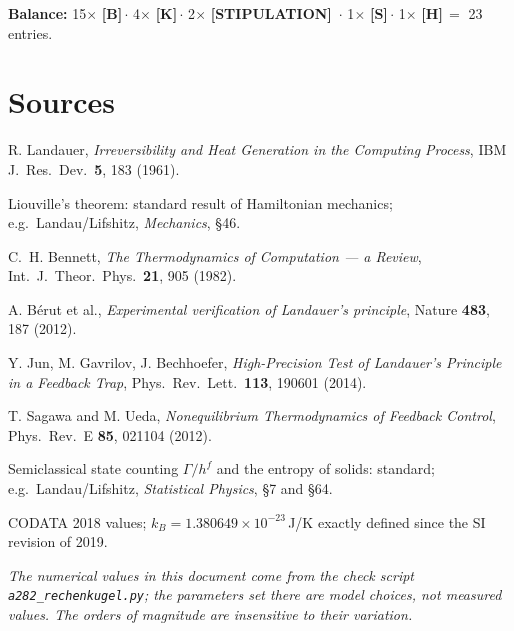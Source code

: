 \documentclass[11pt,a4paper]{article}
\newcommand{\LS}{\textcolor{laySet}{\textbf{\footnotesize\textsf{[STIPULATION]}}}\,}
\newcommand{\LK}{\textcolor{layK}{\textbf{\footnotesize\textsf{[K]}}}\,}
\newcommand{\LB}{\textcolor{layB}{\textbf{\footnotesize\textsf{[B]}}}\,}
\newcommand{\LSk}{\textcolor{layS}{\textbf{\footnotesize\textsf{[S]}}}\,}
\newcommand{\LH}{\textcolor{layH}{\textbf{\footnotesize\textsf{[H]}}}\,}
\begin{document}
\textbf{Balance:} 15$\times$ \LB $\cdot$ 4$\times$ \LK $\cdot$ 2$\times$ \LS
$\cdot$ 1$\times$ \LSk $\cdot$ 1$\times$ \LH $=$ 23 entries.

\clearpage
{}
{}
\section*{Sources}

\begingroup
\small
\begin{description}[leftmargin=3.2em,style=sameline,itemsep=0.3em]

\item[{[B1]}] R. Landauer, \emph{Irreversibility and Heat Generation in the
Computing Process}, IBM J.\ Res.\ Dev.\ \textbf{5}, 183 (1961).

\item[{[B2]}] Liouville's theorem: standard result of Hamiltonian mechanics;
e.g.\ Landau/Lifshitz, \emph{Mechanics}, §46.

\item[{[B3]}] C.~H. Bennett, \emph{The Thermodynamics of Computation --- a
Review}, Int.\ J.\ Theor.\ Phys.\ \textbf{21}, 905 (1982).

\item[{[B4]}] A. Bérut et al., \emph{Experimental verification of Landauer's
principle}, Nature \textbf{483}, 187 (2012).

\item[{[B5]}] Y. Jun, M. Gavrilov, J. Bechhoefer, \emph{High-Precision Test of
Landauer's Principle in a Feedback Trap}, Phys.\ Rev.\ Lett.\ \textbf{113},
190601 (2014).

\item[{[B6]}] T. Sagawa and M. Ueda, \emph{Nonequilibrium Thermodynamics of
Feedback Control}, Phys.\ Rev.\ E \textbf{85}, 021104 (2012).

\item[{[B7]}] Semiclassical state counting $\Gamma/h^f$ and the entropy of
solids: standard; e.g.\ Landau/Lifshitz, \emph{Statistical Physics}, §7 and §64.

\item[{[B8]}] CODATA 2018 values; $k_B = 1.380649\times10^{-23}$\,J/K exactly
defined since the SI revision of 2019.

\end{description}
\endgroup

\vspace{1em}
\noindent
{\small\itshape The numerical values in this document come from the check script
\texttt{a282\_rechenkugel.py}; the parameters set there are model choices, not
measured values. The orders of magnitude are insensitive to their variation.}
\end{document}
